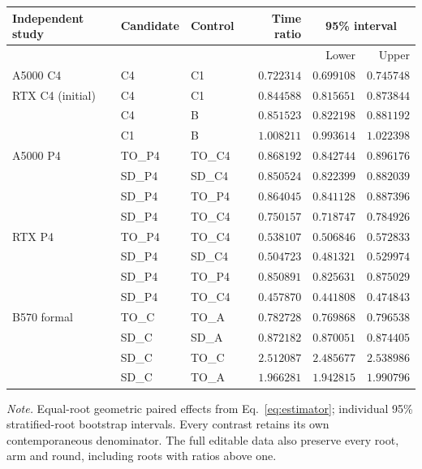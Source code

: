\begingroup
\fontsize{8.7}{10.5}\selectfont
\setlength{\tabcolsep}{3.2pt}\renewcommand{\arraystretch}{1.03}
\noindent
\begin{tabularx}{\linewidth}{@{}>{\raggedright\arraybackslash}Xllrrr@{}}
\toprule
Independent study & Candidate & Control & Time ratio & \multicolumn{2}{c}{95\% interval}\\
\cmidrule(lr){5-6}
 &  &  &  & Lower & Upper\\
\midrule
A5000 C4 & C4 & C1 & $0.722314$ & $0.699108$ & $0.745748$\\
\midrule
RTX C4 (initial) & C4 & C1 & $0.844588$ & $0.815651$ & $0.873844$\\
 & C4 & B & $0.851523$ & $0.822198$ & $0.881192$\\
 & C1 & B & $1.008211$ & $0.993614$ & $1.022398$\\
\midrule
A5000 P4 & TO\_P4 & TO\_C4 & $0.868192$ & $0.842744$ & $0.896176$\\
 & SD\_P4 & SD\_C4 & $0.850524$ & $0.822399$ & $0.882039$\\
 & SD\_P4 & TO\_P4 & $0.864045$ & $0.841128$ & $0.887396$\\
 & SD\_P4 & TO\_C4 & $0.750157$ & $0.718747$ & $0.784926$\\
\midrule
RTX P4 & TO\_P4 & TO\_C4 & $0.538107$ & $0.506846$ & $0.572833$\\
 & SD\_P4 & SD\_C4 & $0.504723$ & $0.481321$ & $0.529974$\\
 & SD\_P4 & TO\_P4 & $0.850891$ & $0.825631$ & $0.875029$\\
 & SD\_P4 & TO\_C4 & $0.457870$ & $0.441808$ & $0.474843$\\
\midrule
B570 formal & TO\_C & TO\_A & $0.782728$ & $0.769868$ & $0.796538$\\
 & SD\_C & SD\_A & $0.872182$ & $0.870051$ & $0.874405$\\
 & SD\_C & TO\_C & $2.512087$ & $2.485677$ & $2.538986$\\
 & SD\_C & TO\_A & $1.966281$ & $1.942815$ & $1.990796$\\
\bottomrule
\end{tabularx}
\par\smallskip
\fontsize{8}{9.6}\selectfont\raggedright
\textit{Note.} Equal-root geometric paired effects from Eq.~\ref{eq:estimator}; individual 95\% stratified-root bootstrap intervals. Every contrast retains its own contemporaneous denominator. The full editable data also preserve every root, arm and round, including roots with ratios above one.
\par\endgroup
